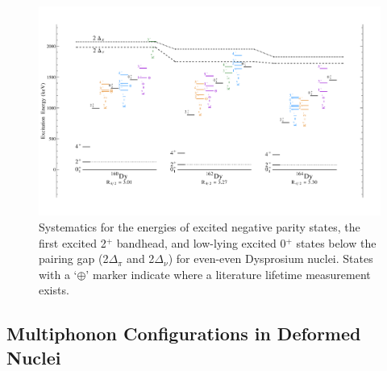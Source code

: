 \begin{landscape}
\begin{figure}[ht] 
\begin{center}
\includegraphics[height=0.8\textheight]{figures/SciDraw_DySystematics_Octupole.pdf}
\caption{Systematics for the energies of excited negative parity states, the first excited 2$^+$ bandhead, and low-lying excited 0$^+$ states below the pairing gap (2$\Delta_\pi$ and 2$\Delta_\nu$) for even-even Dysprosium nuclei. States with a `$\oplus$' marker indicate where a literature lifetime measurement exists.
\label{fig:DySystematics_Octupole}}
\end{center}
\end{figure}
\end{landscape}

\subsection{Multiphonon Configurations in Deformed Nuclei}

